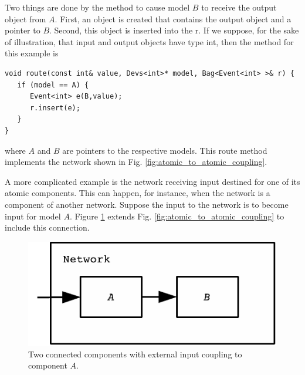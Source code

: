 Two things are done by the  method to cause  model $B$ to receive the output object from $A$. First, an  object is created that contains the output object and a pointer to $B$. Second, this  object is inserted into the  r. If we suppose, for the sake of illustration, that input and output objects have type int, then the  method for this example is
\begin{verbatim}
void route(const int& value, Devs<int>* model, Bag<Event<int> >& r) {
   if (model == A) {
      Event<int> e(B,value);
      r.insert(e);
   }
}
\end{verbatim}
where $A$ and $B$ are pointers to the respective models. This route method implements the network shown in Fig. \ref{fig:atomic_to_atomic_coupling}.

A more complicated example is the network receiving input destined for one of its atomic components. This can happen, for instance, when the network is a component of another network. Suppose the input to the network is to become input for  model $A$. Figure \ref{fig:eic_atomic_to_atomic_coupling} extends Fig. \ref{fig:atomic_to_atomic_coupling} to include this connection.
\begin{figure}[ht]
\centering
\includegraphics{network_models_figs/eic_atomic_atomic_coupling.pdf}
\caption{Two connected  components with external input coupling to component $A$.}
\label{fig:eic_atomic_to_atomic_coupling}
\end{figure} 

